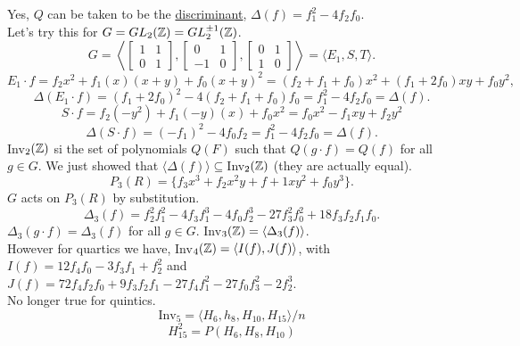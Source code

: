 \documentclass[12pt]{article}
\begin{document}
Yes, $Q$ can be taken to be the \underline{discriminant}, $\Delta(f)=f_1^2-4f_2f_0$.\\
Let's try this for $G=GL_2(\mathbb{Z})=GL_2^{\pm1}(\mathbb{Z})$. 
\[
    G=\left\langle
    \begin{bmatrix}
        1&1\\0&1
    \end{bmatrix},
    \begin{bmatrix}
        0&1\\-1&0
    \end{bmatrix},
    \begin{bmatrix}
        0&1\\1&0
    \end{bmatrix}
    \right\rangle=\langle E_1,S,T\rangle.
\] 
\[
    E_1\cdot f=f_2x^2+f_1(x)(x+y)+f_0(x+y)^2=(f_2+f_1+f_0)x^2+(f_1+2f_0)xy+f_0y^2,
\]
\[
    \Delta(E_1\cdot f)=(f_1+2f_0)^2-4(f_2+f_1+f_0)f_0=f_1^2-4f_2f_0=\Delta(f).
\]
\[
    S\cdot f=f_2(-y^2)+f_1(-y)(x)+f_0x^2=f_0x^2-f_1xy+f_2y^2
\]
\[
    \Delta(S\cdot f)=(-f_1)^2-4f_0f_2=f_1^2-4f_2f_0=\Delta(f).
\]
Inv$_2(\mathbb{Z})$ si the set of polynomials $Q(F)$ such that $Q(g\cdot f)=Q(f)$ for all $g\in G$. We just showed that $\langle\Delta(f)\rangle\subseteq$Inv$_2(\mathbb{Z})$ (they are actually equal).
\[
    P_3(R)=\{f_3x^3+f_2x^2y+f+1xy^2+f_0y^3\}.
\]
$G$ acts on $P_3(R)$ by substitution. 
\[
    \Delta_3(f)=f_2^2f_1^2-4f_3f_1^3-4f_0f_2^3-27f_3^2f_0^2+18f_3f_2f_1f_0.
\]
$\Delta_3(g\cdot f)=\Delta_3(f)$ for all $g\in G$. Inv$_3(\mathbb{Z})=\langle\Delta_3(f)\rangle$.\\
However for quartics we have, Inv$_4(\mathbb{Z})=\langle I(f),J(f)\rangle$, with $I(f)=12f_4f_0-3f_3f_1+f_2^2$ and $J(f)=72f_4f_2f_0+9f_3f_2f_1-27f_4f_1^2-27f_0f_3^2-2f_2^3$.\\
No longer true for quintics. 
\[
    \text{Inv}_5=\langle H_6,h_8,H_{10},H_{15}\rangle/ n
\]
\[
    H^2_{15}=P(H_6,H_8,H_{10})
\]
\end{document}
